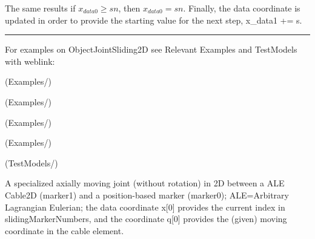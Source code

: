     The same results if $x_{data0}\ge sn$, then $x_{data0} = sn$.
    Finally, the data coordinate is updated in order to provide the starting value for the next step,
    \be
      x_{data1} \;+\!\!= s.
    \ee
\vspace{6pt}\par\noindent\rule{\textwidth}{0.4pt}
%
\noindent For examples on ObjectJointSliding2D see Relevant Examples and TestModels with weblink:
\bi
\item {} (Examples/)
\item {} (Examples/)
\item {} (Examples/)
\item {} (Examples/)
\item {} (TestModels/)

\ei

%
\newpage


\label{sec:item:ObjectJointALEMoving2D}
A specialized axially moving joint (without rotation) in 2D between a ALE Cable2D (marker1) and a position-based marker (marker0); ALE=Arbitrary Lagrangian Eulerian; the data coordinate x[0] provides the current index in slidingMarkerNumbers, and the  coordinate q[0] provides the (given) moving coordinate in the cable element.
\vspace{12pt}\\

